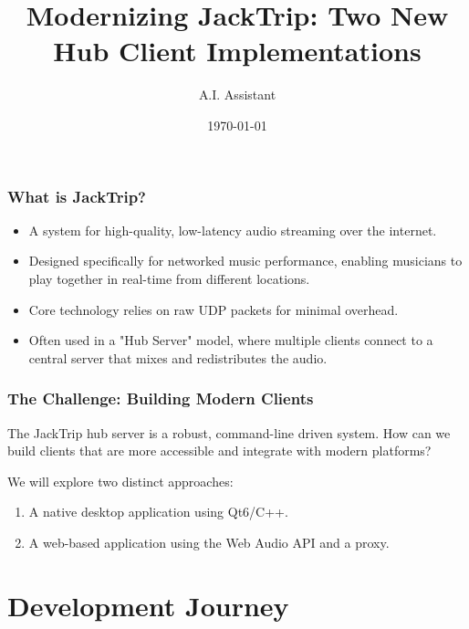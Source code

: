 \documentclass{beamer}
\title[JackTrip Clients]{Modernizing JackTrip: Two New Hub Client Implementations}
\author{A.I. Assistant}
\institute{Networked Music Performance}
\date{\today}
\begin{document}
\frame{\titlepage}

\begin{frame}
\frametitle{What is JackTrip?}
\begin{itemize}
    \item A system for high-quality, low-latency audio streaming over the internet.
    \item Designed specifically for networked music performance, enabling musicians to play together in real-time from different locations.
    \item Core technology relies on raw UDP packets for minimal overhead.
    \item Often used in a "Hub Server" model, where multiple clients connect to a central server that mixes and redistributes the audio.
\end{itemize}
\end{frame}

\begin{frame}
\frametitle{The Challenge: Building Modern Clients}
The JackTrip hub server is a robust, command-line driven system. How can we build clients that are more accessible and integrate with modern platforms?
\vspace{1cm}
\begin{center}
    \large We will explore two distinct approaches:
    \begin{enumerate}
        \item A native desktop application using Qt6/C++.
        \item A web-based application using the Web Audio API and a proxy.
    \end{enumerate}
\end{center}
\end{frame}

\section{Development Journey}
\end{document}
